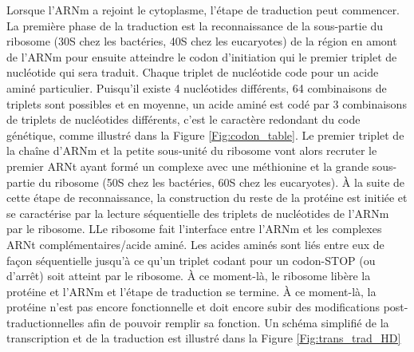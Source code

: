 

Lorsque l'ARNm a rejoint le cytoplasme, l'étape de traduction peut commencer. La première phase de la traduction est la reconnaissance de la sous-partie du ribosome (30S chez les bactéries, 40S chez les eucaryotes) de la région en amont de l'ARNm pour ensuite atteindre le codon d'initiation qui le premier triplet de nucléotide qui sera traduit. Chaque triplet de nucléotide code pour un acide aminé particulier. Puisqu'il existe 4 nucléotides différents, 64 combinaisons de triplets sont possibles et en moyenne, un acide aminé est codé par 3 combinaisons de triplets de nucléotides différents, c'est le caractère redondant du code génétique, comme illustré dans la Figure \ref{Fig:codon_table}. 
Le premier triplet de la chaîne d'ARNm et la petite sous-unité du ribosome vont alors recruter le premier ARNt ayant formé un complexe avec une méthionine et la grande sous-partie du ribosome (50S chez les bactéries, 60S chez les eucaryotes). À la suite de cette étape de reconnaissance, la construction du reste de la protéine est initiée et se caractérise par la lecture séquentielle des triplets de nucléotides de l'ARNm par le ribosome. LLe ribosome fait l'interface entre l'ARNm et les complexes ARNt complémentaires/acide aminé. Les acides aminés sont liés entre eux de façon séquentielle jusqu'à ce qu'un triplet codant pour un codon-STOP (ou d'arrêt) soit atteint par le ribosome. À ce moment-là, le ribosome libère la protéine et l'ARNm et l'étape de traduction se termine. À ce moment-là, la protéine n'est pas encore fonctionnelle et doit encore subir des modifications post-traductionnelles afin de pouvoir remplir sa fonction. Un schéma simplifié de la transcription et de la traduction est illustré dans la Figure \ref{Fig:trans_trad_HD}


